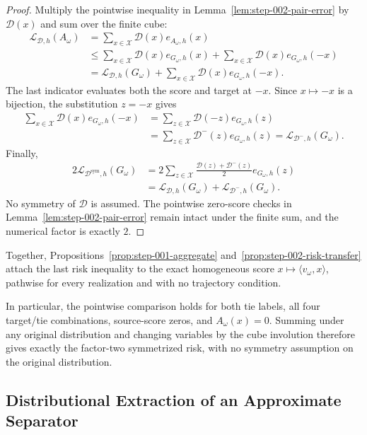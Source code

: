 \begin{proof}
Multiply the pointwise inequality in
Lemma~\ref{lem:step-002-pair-error} by $\mathcal D(x)$ and sum over the
finite cube:
\[
\begin{aligned}
\mathcal L_{\mathcal D,h}(A_\omega)
&=\sum_{x\in\mathcal X}\mathcal D(x)e_{A_\omega,h}(x)\\
&\leq\sum_{x\in\mathcal X}\mathcal D(x)e_{G_\omega,h}(x)
 +\sum_{x\in\mathcal X}\mathcal D(x)e_{G_\omega,h}(-x)\\
&=\mathcal L_{\mathcal D,h}(G_\omega)
 +\sum_{x\in\mathcal X}\mathcal D(x)e_{G_\omega,h}(-x).
\end{aligned}
\]
The last indicator evaluates both the score and target at $-x$.  Since
$x\mapsto-x$ is a bijection, the substitution $z=-x$ gives
\[
\begin{aligned}
\sum_{x\in\mathcal X}\mathcal D(x)e_{G_\omega,h}(-x)
&=\sum_{z\in\mathcal X}\mathcal D(-z)e_{G_\omega,h}(z)\\
&=\sum_{z\in\mathcal X}\mathcal D^-(z)e_{G_\omega,h}(z)
 =\mathcal L_{\mathcal D^-,h}(G_\omega).
\end{aligned}
\]
Finally,
\[
\begin{aligned}
2\mathcal L_{\mathcal D^{\mathrm{sym}},h}(G_\omega)
&=2\sum_{z\in\mathcal X}
 \frac{\mathcal D(z)+\mathcal D^-(z)}2e_{G_\omega,h}(z)\\
&=\mathcal L_{\mathcal D,h}(G_\omega)
 +\mathcal L_{\mathcal D^-,h}(G_\omega).
\end{aligned}
\]
No symmetry of $\mathcal D$ is assumed.  The pointwise zero-score checks in
Lemma~\ref{lem:step-002-pair-error} remain intact under the finite sum, and
the numerical factor is exactly $2$.
\end{proof}

Together, Propositions~\ref{prop:step-001-aggregate}
and~\ref{prop:step-002-risk-transfer} attach the last risk inequality to the
exact homogeneous score $x\mapsto\langle v_\omega,x\rangle$, pathwise for
every realization and with no trajectory condition.

In particular, the pointwise comparison holds for both tie labels, all four
target/tie combinations, source-score zeros, and $A_\omega(x)=0$.  Summing
under any original distribution and changing variables by the cube involution
therefore gives exactly the factor-two symmetrized risk, with no symmetry
assumption on the original distribution.

\subsection{Distributional Extraction of an Approximate Separator}
\label{app:expected-extraction}

